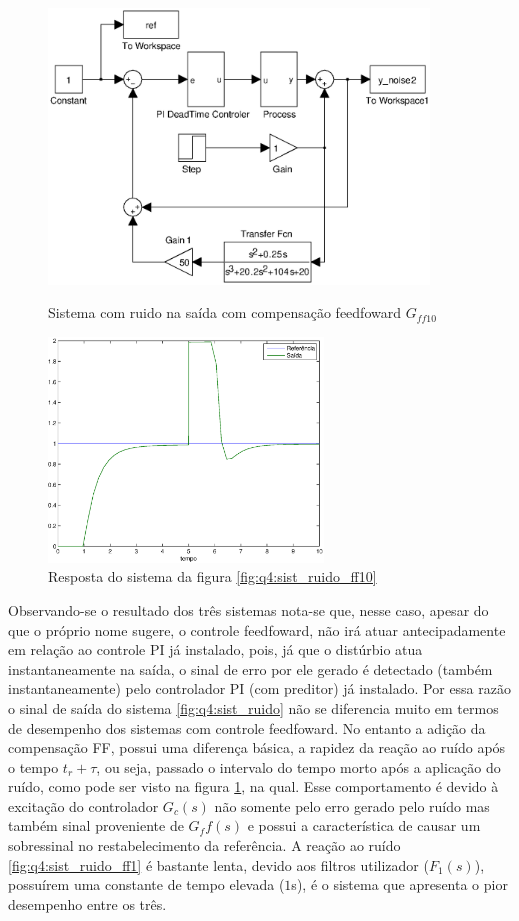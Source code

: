 \begin{figure}[htb]
\centering
\includegraphics[width=0.9\textwidth]{imgs/questao4/sist_ruido_ff2}
\caption{Sistema com ruido na saída com compensação feedfoward $G_{ff10}$}
\label{fig:q4:sist_ruido_ff10}
\includegraphics[width=0.65\textwidth]{imgs/questao4/saida_ruido_ff2}
\caption{Resposta do sistema da figura \ref{fig:q4:sist_ruido_ff10}}
\label{fig:q4:saida_ruido_ff10}
\end{figure}

Observando-se o resultado dos três sistemas nota-se que, nesse caso, apesar do
que o próprio nome sugere, o controle feedfoward, não irá atuar antecipadamente
em relação ao controle PI já instalado, pois, já que o distúrbio atua
instantaneamente na saída, o sinal de erro por ele gerado é detectado (também
instantaneamente) pelo controlador PI (com preditor) já instalado. Por essa
razão o sinal de saída do sistema \ref{fig:q4:sist_ruido} não se diferencia
muito em termos de desempenho dos sistemas com controle feedfoward. No entanto a
adição da compensação FF, possui uma diferença básica, a rapidez da reação ao ruído
após o tempo $t_r + \tau$, ou seja, passado o intervalo do tempo morto após a
aplicação do ruído, como pode ser visto na figura \ref{fig:q4:saida_ruido_ff10},
na qual. Esse comportamento é devido à excitação do controlador $G_c(s)$ não somente pelo
erro gerado pelo ruído mas também sinal proveniente de $G_ff(s)$ e possui a
característica de causar um sobressinal no restabelecimento da referência. A
reação ao ruído \ref{fig:q4:sist_ruido_ff1} é bastante lenta, devido aos filtros
utilizador ($F_1(s)$), possuírem uma constante de tempo elevada ($1$s), é o
sistema que apresenta o pior desempenho entre os três.

